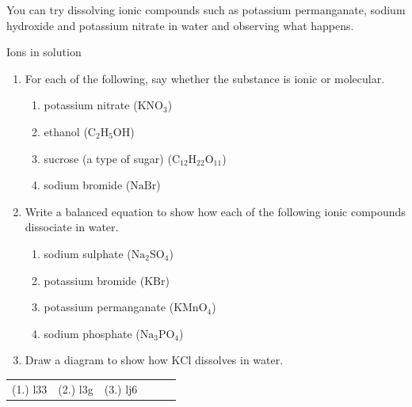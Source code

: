     \noindent
You can try dissolving ionic compounds such as potassium permanganate, sodium hydroxide and potassium nitrate in water and observing what happens. 
  \label{m38720*secfhsst!!!underscore!!!id338}
            \begin{exercises}{Ions in solution}
            \nopagebreak \noindent
            \label{m38720*id336094}\begin{enumerate}[noitemsep, label=\textbf{\arabic*}. ] 
            \label{m38720*uid22}\item For each of the following, say whether the substance is ionic or molecular.
\label{m38720*id336110}\begin{enumerate}[noitemsep, label=\textbf{\alph*}. ] 
            \label{m38720*uid23}\item potassium nitrate ($\text{KNO}_{3}$)
\label{m38720*uid24}\item ethanol ($\text{C}_{2}\text{H}_{5}\text{OH}$)
\label{m38720*uid25}\item sucrose (a type of sugar) ($\text{C}_{12}\text{H}_{22}\text{O}_{11}$)
\label{m38720*uid26}\item sodium bromide ($\text{NaBr}$)
\end{enumerate}
\label{m38720*uid27}\item Write a balanced equation to show how each of the following ionic compounds dissociate in water.
\label{m38720*id336252}\begin{enumerate}[noitemsep, label=\textbf{\alph*}. ] 
            \label{m38720*uid28}\item sodium sulphate ($\text{Na}_{2}\text{SO}_{4}$)
\label{m38720*uid29}\item potassium bromide ($\text{KBr}$)
\label{m38720*uid30}\item potassium permanganate ($\text{KMnO}_{4}$)
\label{m38720*uid31}\item sodium phosphate ($\text{Na}_{3}\text{PO}_{4}$)
\end{enumerate}
\item Draw a diagram to show how $\text{KCl}$ dissolves in water.
\end{enumerate}
\practiceinfo
\par 
 \par \begin{tabular}[h]{cccccc}
 (1.) l33  &  (2.) l3g  & (3.) lj6 \end{tabular}
\end{exercises}

